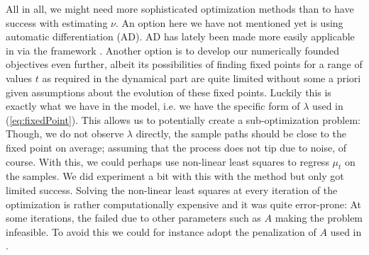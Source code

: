 All in all, we might need more sophisticated optimization methods than  to have success with estimating $\nu$. An option here we have not mentioned yet is using automatic differentiation (AD). AD has lately been made more easily applicable in  via the  framework \cite{torch}. Another option is to develop our numerically founded objectives even further, albeit its possibilities of finding fixed points for a range of values $t$ as required in the dynamical part are quite limited without some a priori given assumptions about the evolution of these fixed points. Luckily this is exactly what we have in the model, i.e. we have the specific form of $\lambda$ used in (\ref{eq:fixedPoint}). This allows us to potentially create a sub-optimization problem: Though, we do not observe $\lambda$ directly, the sample paths should be close to the fixed point on average; assuming that the process does not tip due to noise, of course. With this, we could perhaps use non-linear least squares to regress $\mu_t$ on the samples. We did experiment a bit with this with the method  but only got limited success. Solving the non-linear least squares at every iteration of the optimization is rather computationally expensive and it was quite error-prone: At some iterations, the  failed due to other parameters such as $A$ making the problem infeasible. To avoid this we could for instance adopt the penalization of $A$ used in \cite{Ditlevsen2023}.\\\\
